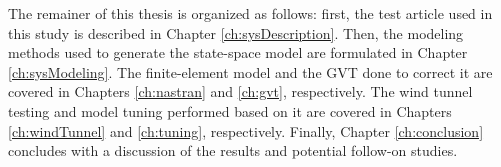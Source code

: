 The remainer of this thesis is organized as follows: first, the test article used in this study is described in Chapter \ref{ch:sysDescription}. Then, the modeling methods used to generate the state-space model are formulated in Chapter \ref{ch:sysModeling}. The finite-element model and the GVT done to correct it are covered in Chapters \ref{ch:nastran} and \ref{ch:gvt}, respectively. The wind tunnel testing and model tuning performed based on it are covered in Chapters \ref{ch:windTunnel} and \ref{ch:tuning}, respectively. Finally, Chapter \ref{ch:conclusion} concludes with a discussion of the results and potential follow-on studies.
